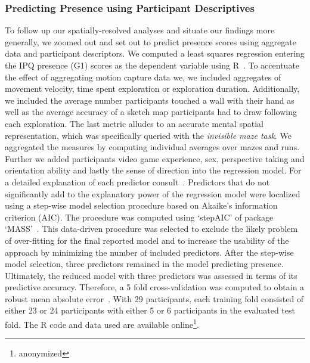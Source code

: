 \subsubsection{Predicting Presence using Participant Descriptives} 
To follow up our spatially-resolved analyses and situate our findings more generally, we zoomed out and set out to predict presence scores using aggregate data and participant descriptors. We computed a least squares regression entering the IPQ presence (G1) scores as the dependent variable using R~\cite{RFoundationforStatisticalComputing.2018}. To accentuate the effect of aggregating motion capture data we, we included aggregates of movement velocity, time spent exploration or exploration duration. Additionally, we included the average number participants touched a wall with their hand as well as the average accuracy of a sketch map participants had to draw following each exploration. The last metric alludes to an accurate mental spatial representation, which was specifically queried with the \textit{invisible maze task}. We aggregated the measures by computing individual averages over mazes and runs. Further we added participants video game experience, sex, perspective taking and orientation ability and lastly the sense of direction into the regression model. For a detailed explanation of each predictor consult~\cite{Gehrke2018}. Predictors that do not significantly add to the explanatory power of the regression model were localized using a step-wise model selection procedure based on Akaike's information criterion (AIC). The procedure was computed using `stepAIC' of package `MASS'~\cite{Akaike1998a, Venables2002}. This data-driven procedure was selected to exclude the likely problem of over-fitting for the final reported model and to increase the usability of the approach by minimizing the number of included predictors. After the step-wise model selection, three predictors remained in the model predicting presence. Ultimately, the reduced model with three predictors was assessed in terms of its predictive accuracy. Therefore, a 5 fold cross-validation was computed to obtain a robust mean absolute error~\cite{Mosteller1968, Furnkranz2011}. With 29 participants, each training fold consisted of either 23 or 24 participants with either 5 or 6 participants in the evaluated test fold. The R code and data used are available online\footnote{anonymized}.
